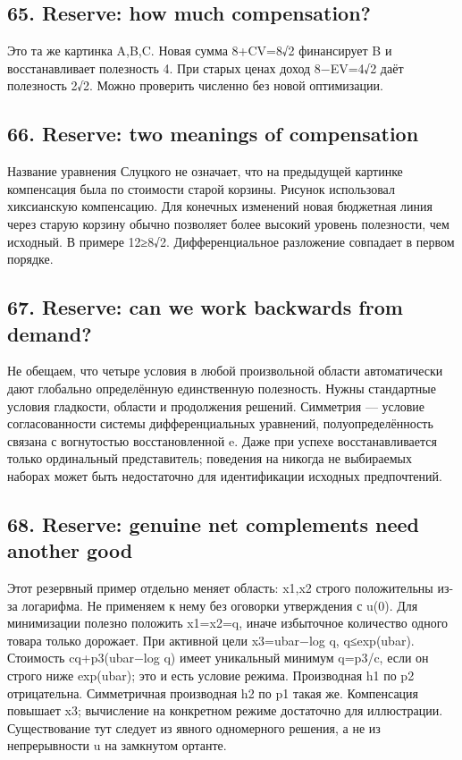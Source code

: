 \documentclass[11pt,a4paper]{article}
\begin{document}
\subsection*{65. Reserve: how much compensation?}
Это та же картинка A,B,C. Новая сумма 8+CV=8√2 финансирует B и восстанавливает полезность 4. При старых ценах доход 8−EV=4√2 даёт полезность 2√2. Можно проверить численно без новой оптимизации.

\subsection*{66. Reserve: two meanings of compensation}
Название уравнения Слуцкого не означает, что на предыдущей картинке компенсация была по стоимости старой корзины. Рисунок использовал хиксианскую компенсацию. Для конечных изменений новая бюджетная линия через старую корзину обычно позволяет более высокий уровень полезности, чем исходный. В примере 12≥8√2. Дифференциальное разложение совпадает в первом порядке.

\subsection*{67. Reserve: can we work backwards from demand?}
Не обещаем, что четыре условия в любой произвольной области автоматически дают глобально определённую единственную полезность. Нужны стандартные условия гладкости, области и продолжения решений. Симметрия — условие согласованности системы дифференциальных уравнений, полуопределённость связана с вогнутостью восстановленной e. Даже при успехе восстанавливается только ординальный представитель; поведения на никогда не выбираемых наборах может быть недостаточно для идентификации исходных предпочтений.

\subsection*{68. Reserve: genuine net complements need another good}
Этот резервный пример отдельно меняет область: x1,x2 строго положительны из-за логарифма. Не применяем к нему без оговорки утверждения с u(0). Для минимизации полезно положить x1=x2=q, иначе избыточное количество одного товара только дорожает. При активной цели x3=ubar−log q, q≤exp(ubar). Стоимость cq+p3(ubar−log q) имеет уникальный минимум q=p3/c, если он строго ниже exp(ubar); это и есть условие режима. Производная h1 по p2 отрицательна. Симметричная производная h2 по p1 такая же. Компенсация повышает x3; вычисление на конкретном режиме достаточно для иллюстрации. Существование тут следует из явного одномерного решения, а не из непрерывности u на замкнутом ортанте.
\end{document}
